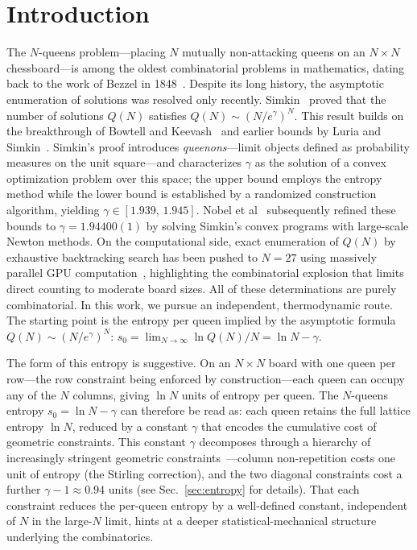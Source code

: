 \documentclass[aps, pre, reprint, amsmath, amssymb, superscriptaddress, floatfix]{revtex4-2}
\begin{document}
\maketitle


\section{Introduction}
\label{sec:intro}

The $N$-queens problem---placing $N$ mutually non-attacking queens on
an $N \times N$ chessboard---is among the oldest combinatorial
problems in mathematics, dating back to the work of Bezzel in
1848~\cite{Bezzel1848}.  Despite its long history, the asymptotic
enumeration of solutions was resolved only recently.  Simkin~\cite{Simkin2022}
proved that the number of solutions $Q(N)$ satisfies
$Q(N) \sim (N/e^{\gamma})^N$.
This result builds on the breakthrough of Bowtell and
Keevash~\cite{Bowtell2023} and earlier bounds by Luria and
Simkin~\cite{Luria2021}.  Simkin's proof introduces \emph{queenons}---limit
objects defined as probability measures on the unit square---and
characterizes $\gamma$ as the solution of a convex optimization
problem over this space; the upper bound employs the entropy method
while the lower bound is established by a randomized construction
algorithm, yielding $\gamma \in [1.939,\, 1.945]$.
Nobel et al~\cite{Nobel2023} subsequently refined these
bounds to $\gamma = 1.94400(1)$ by solving
Simkin's convex programs with large-scale Newton methods.
On the computational side, exact enumeration of $Q(N)$ by exhaustive
backtracking search has been pushed to $N = 27$ using massively
parallel GPU computation~\cite{Yao2025}, highlighting the
combinatorial explosion that limits direct counting to moderate board
sizes.
All of these determinations are purely combinatorial.
In this work, we pursue an independent, thermodynamic route.
The starting point is the entropy per queen implied by the
asymptotic formula $Q(N) \sim (N/e^\gamma)^N$:
$s_0 = \lim_{N \to \infty} \ln Q(N)/N = \ln N - \gamma$.

The form of this entropy is suggestive.  On an
$N \times N$ board with one queen per row---the row constraint being
enforced by construction---each queen can occupy any of the $N$
columns, giving $\ln N$ units of entropy per queen.  The $N$-queens entropy $s_0 = \ln N - \gamma$ can
therefore be read as: each queen retains the full lattice entropy
$\ln N$, reduced by a constant $\gamma$ that encodes the cumulative
cost of geometric constraints.  This constant $\gamma$ decomposes
through a hierarchy of increasingly stringent geometric
constraints~\cite{Knuth2022}---column non-repetition costs one unit
of entropy (the Stirling correction), and the two diagonal constraints
cost a further $\gamma - 1 \approx 0.94$ units
(see Sec.~\ref{sec:entropy} for details).
That each constraint reduces the per-queen entropy by a well-defined
constant, independent of $N$ in the large-$N$ limit, hints at a
deeper statistical-mechanical structure underlying the combinatorics.
\end{document}
